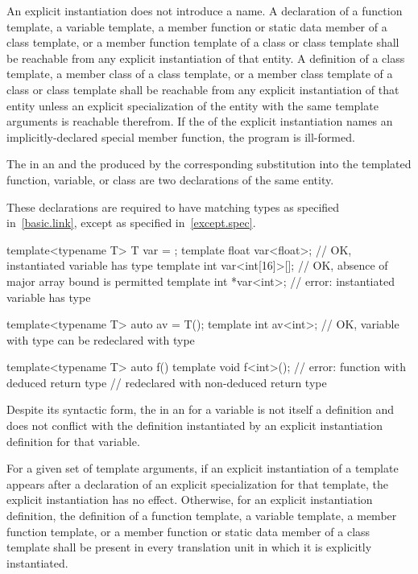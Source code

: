 \pnum
An explicit instantiation does not introduce a name.
A declaration of a function template, a variable template, a member function
or static data member
of a class template, or a member function template of a class or class
template shall be reachable from any explicit instantiation of that entity.
A definition
of a class template, a member class of a class template, or a member class
template of a class or class template shall be reachable from any explicit instantiation
of that entity unless an explicit
specialization of the entity with the same template arguments
is reachable therefrom.
If the 
of the explicit instantiation names an implicitly-declared special member
function, the program is ill-formed.

\pnum
The  in an  and
the  produced by the corresponding substitution
into the templated function, variable, or class
are two declarations of the same entity.
\begin{note}
These declarations are required to have matching types as specified in~\ref{basic.link}, except as specified in~\ref{except.spec}.
\begin{example}
\begin{codeblock}
template<typename T> T var = {};
template float var<float>;      // OK, instantiated variable has type 
template int var<int[16]>[];    // OK, absence of major array bound is permitted
template int *var<int>;         // error: instantiated variable has type 

template<typename T> auto av = T();
template int av<int>;           // OK, variable with type  can be redeclared with type 

template<typename T> auto f() {}
template void f<int>();         // error: function with deduced return type
                                // redeclared with non-deduced return type
\end{codeblock}
\end{example}
\end{note}
Despite its syntactic form, the  in an  for a variable is not itself a definition and does not conflict with the definition instantiated by an explicit instantiation definition for that variable.

\pnum
For a given set of template arguments, if an explicit
instantiation of a template appears after a declaration of
an explicit specialization for that template, the explicit
instantiation has no effect. Otherwise, for an explicit instantiation
definition, the definition of a
function template, a variable template, a member
function template, or a member function or static
data member of a class template shall be present in every
translation unit in which it is explicitly instantiated.

